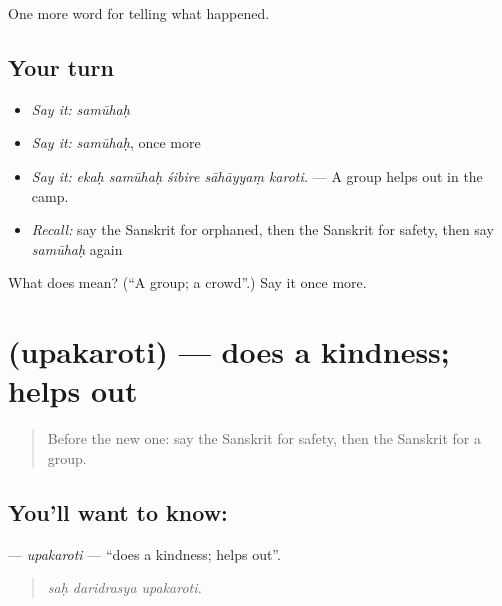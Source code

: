 \begin{grammarlens}[title={What you've built}]
One more word for telling what happened.
\end{grammarlens}

\subsection*{Your turn}
\begin{itemize}
\raggedright
  \item \emph{Say it:} \emph{samūhaḥ}
  \item \emph{Say it:} \emph{samūhaḥ}, once more
  \item \emph{Say it:} \emph{ekaḥ samūhaḥ śibire sāhāyyaṃ karoti.} — A group helps out in the camp.
  \item \emph{Recall:} say the Sanskrit for orphaned, then the Sanskrit for safety, then say \emph{samūhaḥ} again
\end{itemize}

\begin{tcolorbox}[breakable,colback=teal!4,colframe=teal!35!black,title={Before you move on}]
What does  mean? (\textquotedblleft{}A group; a crowd\textquotedblright{}.) Say it once more.
\end{tcolorbox}
\section[\texorpdfstring{\sk{उपकरोति} (upakaroti)}{उपकरोति (upakaroti)}]{ (upakaroti) — does a kindness; helps out}

\label{lesson:SA-C308-upakaroti}



\begin{quote}
Before the new one: say the Sanskrit for safety, then the Sanskrit for a group.
\end{quote}

\subsection*{You'll want to know: }
\textbf{} — \emph{upakaroti} — \textquotedblleft{}does a kindness; helps out\textquotedblright{}.

\begin{quote}
  
\end{quote}

\begin{quote}
\emph{saḥ daridrasya upakaroti.}
\end{quote}


